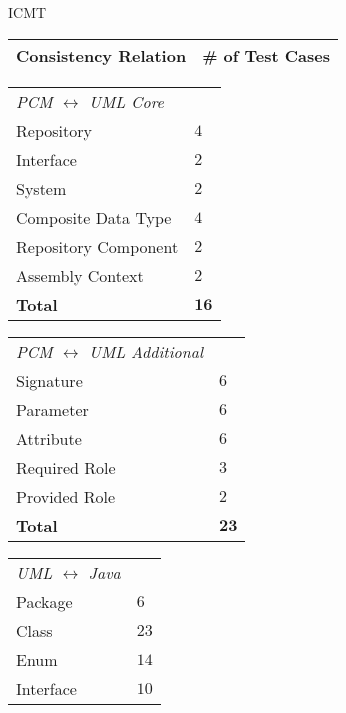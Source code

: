 \begin{copiedFrom}{ICMT}
\begin{table}
    \centering
    \small
    \renewcommand{\arraystretch}{1.2}
    \begin{tabular}{L{13em}C{8em}}
        \toprule
        \textbf{Consistency Relation} & \textbf{\# of Test Cases} \\
        \midrule
    \end{tabular}
    \begin{tabular}{L{13em}C{8em}}
        \textit{\gls{PCM} $\leftrightarrow$ \gls{UML} Core}\\\addlinespace[0.3em]
        Repository              & $4$ \\
        Interface               & $2$ \\
        System                  & $2$ \\
        Composite Data Type     & $4$ \\
        Repository Component    & $2$ \\
        Assembly Context        & $2$ \\\addlinespace[0.3em]
        \textbf{Total}          & $\mathbf{16}$ \\
        \midrule
    \end{tabular}
    \begin{tabular}{L{13em}C{8em}}
        \textit{\gls{PCM} $\leftrightarrow$ \gls{UML} Additional}\\\addlinespace[0.3em]
        Signature       & $6$ \\
        Parameter       & $6$ \\
        Attribute       & $6$ \\
        Required Role   & $3$ \\
        Provided Role   & $2$ \\\addlinespace[0.3em]
        \textbf{Total}  & $\mathbf{23}$ \\
        \midrule
    \end{tabular}
    \begin{tabular}{L{13em}C{8em}}
        \textit{\gls{UML} $\leftrightarrow$ Java} \\\addlinespace[0.3em]
        Package                     & $6$ \\
        Class                       & $23$ \\
        Enum                        & $14$ \\
        Interface                   & $10$ \\

\end{tabular}
\end{table}
\end{copiedFrom}
